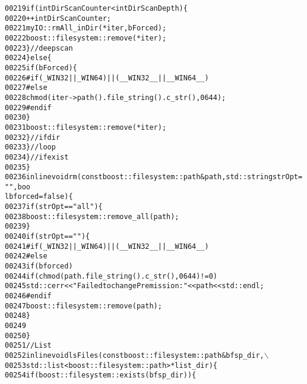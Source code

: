 \begin{footnotesize}
\begin{alltt}
00219                     \textcolor{keywordflow}{if}(intDirScanCounter < intDirScanDepth)\{
00220                         ++intDirScanCounter;
00221                         myIO::rmAll\_inDir(*iter,bForced);
00222                         boost::filesystem::remove(*iter);
00223                     \}\textcolor{comment}{//deep scan}
00224                 \}\textcolor{keywordflow}{else}\{
00225                     \textcolor{keywordflow}{if} (bForced)\{
00226 \textcolor{preprocessor}{                    #if ( \_WIN32 || \_WIN64 ) || ( \_\_WIN32\_\_ || \_\_WIN64\_\_ )}
00227 \textcolor{preprocessor}{}\textcolor{preprocessor}{                    #else}
00228 \textcolor{preprocessor}{}                        chmod(iter->path().file\_string().c\_str(),0644);
00229 \textcolor{preprocessor}{                    #endif}
00230 \textcolor{preprocessor}{}                    \}
00231                     boost::filesystem::remove(*iter);
00232                 \}\textcolor{comment}{//if dir}
00233             \}\textcolor{comment}{//loop}
00234         \}\textcolor{comment}{//if exist}
00235     \}
00236     \textcolor{keyword}{inline} \textcolor{keywordtype}{void} rm(\textcolor{keyword}{const} boost::filesystem::path & path,std::string strOpt=\textcolor{stringliteral}{""},\textcolor{keywordtype}{boo
      l} bforced = \textcolor{keyword}{false})\{
00237         \textcolor{keywordflow}{if} (strOpt == \textcolor{stringliteral}{"all"})\{
00238             boost::filesystem::remove\_all(path);
00239         \}
00240         \textcolor{keywordflow}{if} (strOpt == \textcolor{stringliteral}{""})\{
00241 \textcolor{preprocessor}{            #if ( \_WIN32 || \_WIN64 ) || ( \_\_WIN32\_\_ || \_\_WIN64\_\_ )}
00242 \textcolor{preprocessor}{}\textcolor{preprocessor}{            #else}
00243 \textcolor{preprocessor}{}            \textcolor{keywordflow}{if}(bforced)
00244                 \textcolor{keywordflow}{if} (chmod(path.file\_string().c\_str(),0644) != 0)
00245                     std::cerr<<\textcolor{stringliteral}{"Failed to change Premission: "}<<path<<std::endl;
00246 \textcolor{preprocessor}{            #endif}
00247 \textcolor{preprocessor}{}            boost::filesystem::remove(path);
00248         \}
00249 
00250     \}
00251     \textcolor{comment}{//List}
00252     \textcolor{keyword}{inline} \textcolor{keywordtype}{void} lsFiles(\textcolor{keyword}{const} boost::filesystem::path &bfsp\_dir,\(\backslash\)
00253                         std::list<boost::filesystem::path> *list\_dir)\{
00254         \textcolor{keywordflow}{if}( boost::filesystem::exists( bfsp\_dir ) )\{

\end{alltt}
\end{footnotesize}
